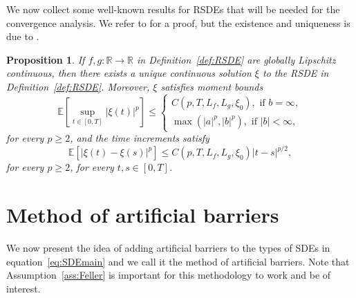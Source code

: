 \documentclass[11pt]{amsart}
\newtheorem{proposition}[theorem]{Proposition}
\newcommand{\E}{{\mathbb E}}
\begin{document}
{We now collect some well-known results for RSDEs that will be needed for the convergence analysis. We refer to \cite{Pilipenko2014AnIT} for a proof, but the existence and uniqueness is due to \cite{MR4521003}.
\begin{proposition}\label{prop:RSDEwellDef}
If $f,g: \mathbb{R} \to \mathbb{R}$ in Definition~\ref{def:RSDE} are globally Lipschitz continuous, then there exists a unique continuous solution $\xi$ to the RSDE in Definition~\ref{def:RSDE}. Moreover, $\xi$ satisfies moment bounds
\begin{equation*}
\E \left[ \sup_{t \in [0,T]} |\xi(t)|^{p} \right] \leq
\begin{cases}
C(p,T,L_{f},L_{g},\xi_{0}), \text{ if } b = \infty,\\
\max(|a|^{p},|b|^{p}), \text{ if } |b| < \infty,
\end{cases}
\end{equation*}
for every $p \geq 2$, and the time increments satisfy
\begin{equation*}
\E \left[ \left| \xi(t) - \xi(s) \right|^{p} \right] \leq C(p,T,L_{f},L_{g},\xi_{0}) |t-s|^{p/2},
\end{equation*}
for every $p \geq 2$, for every $t,s \in [0,T]$.
\end{proposition}

\section{Method of artificial barriers}\label{sec:artBarr}
We now present the idea of adding artificial barriers to the types of SDEs in equation~\eqref{eq:SDEmain} and we call it the method of artificial barriers. Note that Assumption~\ref{ass:Feller} is important for this methodology to work and be of interest. 

}
\end{document}
